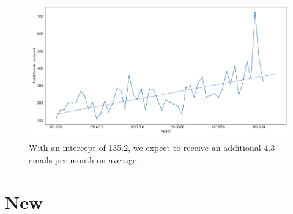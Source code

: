\documentclass[12pt]{article}
\begin{document}
\begin{figure}[h]
    \centering
    \captionsetup{width=.8 \linewidth}
	\includegraphics[width=13cm, height=6cm]{Images/EmailsOverTime.png}
	\caption[Emails Received Per Month]{With an intercept of 135.2, we expect to receive an additional 4.3 emails per month on average.}
\end{figure}

\newpage

\section{New}
\end{document}

